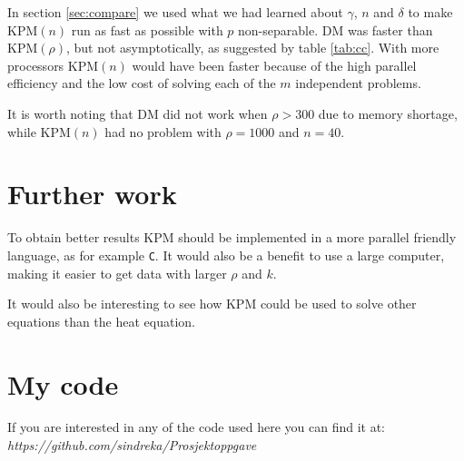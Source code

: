 In section \ref{sec:compare} we used what we had learned about $\gamma$, $n$ and $\delta$ to make KPM$(n)$ run as fast as possible with $p$ non-separable. DM was faster than KPM$(\rho)$, but not asymptotically, as suggested by table \ref{tab:cc}. With more processors KPM$(n)$ would have been faster because of the high parallel efficiency and the low cost of solving each of the $m$ independent problems.

It is worth noting that DM did not work when $\rho>300$ due to memory shortage, while KPM$(n)$ had no problem with $\rho = 1000$ and $n = 40$. \\

\chapter*{Further work}%
To obtain better results KPM should be implemented in a more parallel friendly language, as for example \texttt{C}. It would also be a benefit to use a large computer, making it easier to get data with larger $\rho$ and $k$.

It would also be interesting to see how KPM could be used to solve other equations than the heat equation.
\chapter*{My code}%

If you are interested in any of the code used here you can find it at: \\
\emph{https://github.com/sindreka/Prosjektoppgave}
